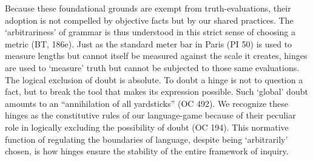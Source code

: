 Because these foundational grounds are exempt from truth-evaluations,
their adoption is not compelled by objective facts but by our shared
practices. The `arbitrariness' of grammar is thus understood in this
strict sense of choosing a metric (BT, 186e). Just as the standard meter
bar in Paris (PI 50) is used to measure lengths but cannot itself be
measured against the scale it creates, hinges are used to `measure'
truth but cannot be subjected to those same evaluations. The logical
exclusion of doubt is absolute. To doubt a hinge is not to question a
fact, but to break the tool that makes its expression possible. Such
`global' doubt amounts to an ``annihilation of all yardsticks'' (OC
492). We recognize these hinges as the constitutive rules of our
language-game because of their peculiar role in logically excluding the
possibility of doubt (OC 194). This normative function of regulating the
boundaries of language, despite being `arbitrarily' chosen, is how
hinges ensure the stability of the entire framework of inquiry.

